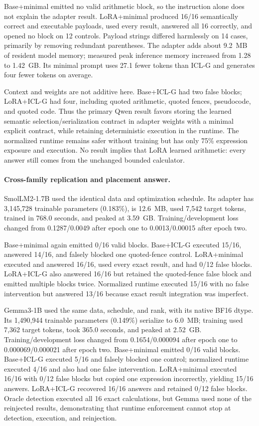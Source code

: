 \documentclass[11pt]{article}
\begin{document}
Base+minimal emitted no valid arithmetic block, so the instruction alone does
not explain the adapter result. LoRA+minimal produced 16/16 semantically correct
and executable payloads, used every result, answered all 16 correctly, and
opened no block on 12 controls. Payload strings differed harmlessly on 14 cases,
primarily by removing redundant parentheses. The adapter adds about 9.2~MB of
resident model memory; measured peak inference memory increased from 1.28 to
1.42~GB. Its minimal prompt uses 27.1 fewer tokens than ICL-G and generates four
fewer tokens on average.

Context and weights are not additive here. Base+ICL-G had two false blocks;
LoRA+ICL-G had four, including quoted arithmetic, quoted fences, pseudocode, and
quoted code. Thus the primary Qwen result favors storing the learned semantic
selection/serialization contract in adapter weights with a minimal explicit
contract, while retaining deterministic execution in the runtime. The normalized
runtime remains safer without training but has only 75\% expression exposure and
execution. No result implies that LoRA learned arithmetic: every answer still
comes from the unchanged bounded calculator.

\paragraph{Cross-family replication and placement answer.}
SmolLM2-1.7B used the identical data and optimization schedule. Its adapter has
3,145,728 trainable parameters (0.183\%), is 12.6~MB, used 7,542 target tokens,
trained in 768.0 seconds, and peaked at 3.59~GB. Training/development loss changed
from 0.1287/0.0049 after epoch one to 0.0013/0.00015 after epoch two.

Base+minimal again emitted 0/16 valid blocks. Base+ICL-G executed 15/16, answered
14/16, and falsely blocked one quoted-fence control. LoRA+minimal executed and
answered 16/16, used every exact result, and had 0/12 false blocks. LoRA+ICL-G
also answered 16/16 but retained the quoted-fence false block and emitted multiple
blocks twice. Normalized runtime executed 15/16 with no false intervention but
answered 13/16 because exact result integration was imperfect.

Gemma3-1B used the same data, schedule, and rank, with its native BF16 dtype.
Its 1,490,944 trainable parameters (0.149\%) serialize to 6.0~MB; training used
7,362 target tokens, took 365.0 seconds, and peaked at 2.52~GB. Training/development
loss changed from 0.1654/0.000094 after epoch one to 0.000069/0.000021 after
epoch two. Base+minimal emitted 0/16 valid blocks. Base+ICL-G executed 5/16 and
falsely blocked one control; normalized runtime executed 4/16 and also had one
false intervention. LoRA+minimal executed 16/16 with 0/12 false blocks but copied
one expression incorrectly, yielding 15/16 answers. LoRA+ICL-G recovered 16/16
answers and retained 0/12 false blocks. Oracle detection executed all 16 exact
calculations, but Gemma used none of the reinjected results, demonstrating that
runtime enforcement cannot stop at detection, execution, and reinjection.
\end{document}
